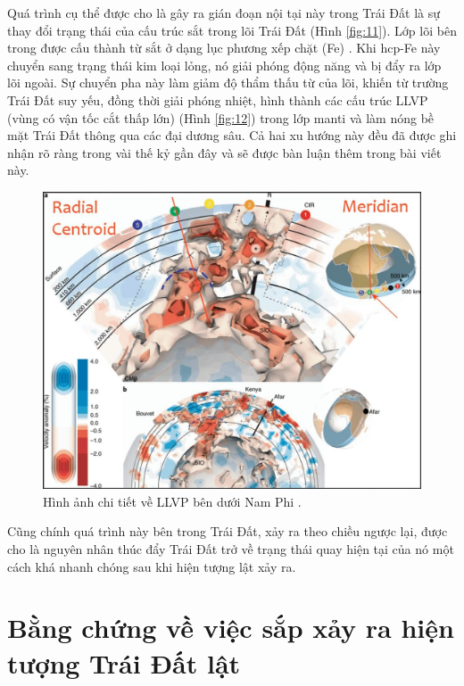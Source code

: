 \documentclass[10pt,twocolumn,letterpaper]{article}
\begin{document}
Quá trình cụ thể được cho là gây ra gián đoạn nội tại này trong Trái Đất là sự thay đổi trạng thái của cấu trúc sắt trong lõi Trái Đất (Hình \ref{fig:11}). Lớp lõi bên trong được cấu thành từ sắt ở dạng lục phương xếp chặt (Fe) \cite{141}. Khi hcp-Fe này chuyển sang trạng thái kim loại lỏng, nó giải phóng động năng và bị đẩy ra lớp lõi ngoài. Sự chuyển pha này làm giảm độ thẩm thấu từ của lõi, khiến từ trường Trái Đất suy yếu, đồng thời giải phóng nhiệt, hình thành các cấu trúc LLVP (vùng có vận tốc cắt thấp lớn) (Hình \ref{fig:12}) \cite{38} trong lớp manti và làm nóng bề mặt Trái Đất thông qua các đại dương sâu. Cả hai xu hướng này đều đã được ghi nhận rõ ràng trong vài thế kỷ gần đây và sẽ được bàn luận thêm trong bài viết này.


\begin{figure}[t]
\begin{center}
   \includegraphics[width=1\linewidth]{llvp.jpg}
\end{center}
   \caption{Hình ảnh chi tiết về LLVP bên dưới Nam Phi \cite{28}.}
\label{fig:12}
\label{fig:onecol}
\end{figure}


Cũng chính quá trình này bên trong Trái Đất, xảy ra theo chiều ngược lại, được cho là nguyên nhân thúc đẩy Trái Đất trở về trạng thái quay hiện tại của nó một cách khá nhanh chóng sau khi hiện tượng lật xảy ra.

\section{Bằng chứng về việc sắp xảy ra hiện tượng Trái Đất lật}
\end{document}
